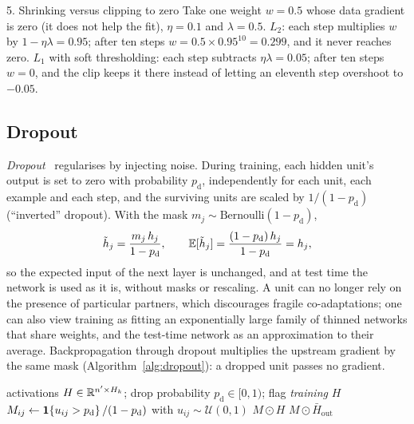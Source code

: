 \documentclass[11pt]{article}
\begin{document}
\begin{worked}{5. Shrinking versus clipping to zero}
Take one weight $w = 0.5$ whose data gradient is zero (it does not help the fit), $\eta = 0.1$ and $\lambda = 0.5$.
\emph{$L_2$}: each step multiplies $w$ by $1 - \eta\lambda = 0.95$; after ten steps $w = 0.5 \times 0.95^{10} = 0.299$, and
it never reaches zero. \emph{$L_1$} with soft thresholding: each step subtracts $\eta\lambda = 0.05$; after ten steps
$w = 0$, and the clip keeps it there instead of letting an eleventh step overshoot to $-0.05$.
\end{worked}

\subsection{Dropout}\label{sec:dropout}

\emph{Dropout}~\cite{srivastava2014} regularises by injecting noise. During training, each hidden unit's output is set
to zero with probability $p_{\mathrm{d}}$, independently for each unit, each example and each step, and the surviving
units are scaled by $1/(1 - p_{\mathrm{d}})$ (``inverted'' dropout). With the mask $m_j \sim \text{Bernoulli}(1 -
p_{\mathrm{d}})$,
\[
  \tilde{h}_j = \frac{m_j\,h_j}{1 - p_{\mathrm{d}}}, \qquad \mathbb{E}[\tilde{h}_j] = \frac{(1 - p_{\mathrm{d}})\,h_j}{1 - p_{\mathrm{d}}} = h_j ,
\]
so the expected input of the next layer is unchanged, and at test time the network is used as it is, without masks or
rescaling. A unit can no longer rely on the presence of particular partners, which discourages fragile
co-adaptations; one can also view training as fitting an exponentially large family of thinned networks that share
weights, and the test-time network as an approximation to their average. Backpropagation through dropout multiplies the
upstream gradient by the same mask (Algorithm~\ref{alg:dropout}): a dropped unit passes no gradient.

\begin{algorithm}[H]
\caption{Inverted dropout on a layer's activations}\label{alg:dropout}
\begin{algorithmic}[1]
\Require activations $H \in \mathbb{R}^{n' \times H_k}$; drop probability $p_{\mathrm{d}} \in [0, 1)$; flag \emph{training}
   \Return $H$ \EndIf {}
  \State $M_{ij} \gets \mathbf{1}\!\left\{u_{ij} > p_{\mathrm{d}}\right\}/(1 - p_{\mathrm{d}})$ with $u_{ij} \sim \mathcal{U}(0, 1)$ 
  \State \Return $M \odot H$
\EndFunction
{} 
  \State \Return $M \odot \bar{H}_{\mathrm{out}}$
\EndFunction
\end{algorithmic}
\end{algorithm}
\end{document}
